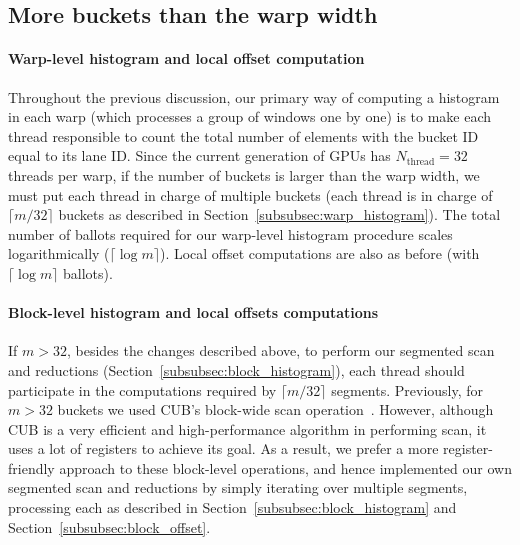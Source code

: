 \subsection{More buckets than the warp width}\label{subsec:more_buckets}
\paragraph{Warp-level histogram and local offset computation}
Throughout the previous discussion, our primary way of computing a histogram in each warp (which processes a group of windows one by one) is to make each thread responsible to count the total number of elements with the bucket ID equal to its lane ID\@.
Since the current generation of GPUs has $N_\text{thread}=32$ threads per warp, if the number of buckets is larger than the warp width, we must put each thread in charge of multiple buckets (each thread is in charge of $\lceil m/32\rceil$ buckets as described in Section~\ref{subsubsec:warp_histogram}).
The total number of ballots required for our warp-level histogram procedure scales logarithmically ($\lceil\log m\rceil$).
Local offset computations are also as before (with $\lceil \log m\rceil$ ballots).

\paragraph{Block-level histogram and local offsets computations}
If $m>32$, besides the changes described above, to perform our segmented scan and reductions (Section~\ref{subsubsec:block_histogram}), 
each thread should participate in the computations required by $\lceil m/32\rceil$ segments.
Previously, for $m > 32$ buckets we used CUB's block-wide scan operation~\cite{Ashkiani:2016:GM}.
However, although CUB is a very efficient and high-performance algorithm in performing scan, it uses a lot of registers to achieve its goal. As a result, we prefer a more register-friendly approach to these block-level operations, and hence implemented our own segmented scan and reductions by simply iterating over multiple segments, processing each as described in Section~\ref{subsubsec:block_histogram} and Section~\ref{subsubsec:block_offset}.
